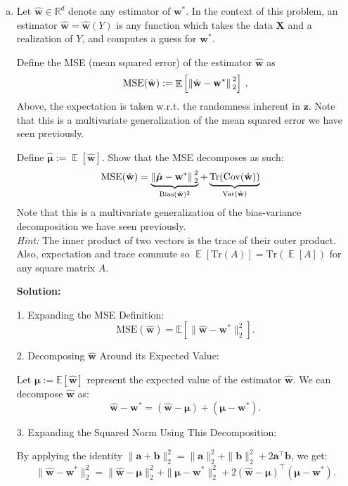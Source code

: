 \documentclass{article}
\newcommand{\mat}[1]{\mathbf{#1}}
\renewcommand{\vec}[1]{\boldsymbol{\mathbf{#1}}}
\DeclareMathOperator*{\E}{\mathbb{E}}
\newenvironment{solution}{\color{blue} \smallskip \textbf{Solution:}}{}
\begin{document}
\begin{enumerate}[(a)]
    \item 
    Let $\hat{\vec{w}} \in \mathbb{R}^{d}$ denote any estimator of $\vec{w}^*$.  In the context of this problem, an estimator $\hat{\vec{w}} = \hat{\vec{w}}(Y)$ is any function which takes the data $\mat{X}$ and a realization of $Y$, and computes a guess for $\vec{w}^*$.
    
    Define the MSE (mean squared error) of the estimator $\hat{\vec{w}}$ as
    \begin{align*}
        \mathrm{MSE}(\hat{\vec{w}}) := \E\left[\norm*{ \hat{\vec{w}} - \vec{w}^* }^2_2\right] \:.
    \end{align*}
    Above, the expectation is taken w.r.t. the randomness inherent in $\vec{z}$. Note that this is a multivariate generalization of the mean squared error we have seen previously.
    
    Define $\hat{\vec{\mu}} := \E[\hat{\vec{w}}]$. Show that the MSE decomposes as such:
    \begin{align*}
        \mathrm{MSE}(\hat{\vec{w}}) &= \underbrace{\norm*{\hat{\vec{\mu}} - \vec{w}^*}^2_2}_{\text{Bias}(\hat{\vec{w}})^2} +  \underbrace{\text{Tr}(\mathrm{Cov}(\hat{\vec{w}}))}_{\text{Var}(\hat{\vec{w}})}
    \end{align*}
    Note that this is a multivariate generalization of the bias-variance decomposition we have seen previously. \\
    \textit{Hint:} The inner product of two vectors is the trace of their outer product. Also, expectation and trace commute so $\E[\text{Tr}(A)] = \text{Tr}( \E[A] )$ for any square matrix $A$.
    
    \begin{solution}

1. Expanding the MSE Definition:
   \[
   \text{MSE}(\hat{\mathbf{w}}) = \mathbb{E} \left[ \| \hat{\mathbf{w}} - \mathbf{w}^* \|_2^2 \right].
   \]

2. Decomposing \(\hat{\mathbf{w}}\) Around its Expected Value:

   Let \(\boldsymbol{\mu} := \mathbb{E}[\hat{\mathbf{w}}]\) represent the expected value of the estimator \(\hat{\mathbf{w}}\). We can decompose \(\hat{\mathbf{w}}\) as:
   \[
   \hat{\mathbf{w}} - \mathbf{w}^* = (\hat{\mathbf{w}} - \boldsymbol{\mu}) + (\boldsymbol{\mu} - \mathbf{w}^*).
   \]

3. Expanding the Squared Norm Using This Decomposition:

   By applying the identity \(\| \mathbf{a} + \mathbf{b} \|_2^2 = \| \mathbf{a} \|_2^2 + \| \mathbf{b} \|_2^2 + 2 \mathbf{a}^\top \mathbf{b}\), we get:
   \[
   \| \hat{\mathbf{w}} - \mathbf{w}^* \|_2^2 = \| \hat{\mathbf{w}} - \boldsymbol{\mu} \|_2^2 + \| \boldsymbol{\mu} - \mathbf{w}^* \|_2^2 + 2 (\hat{\mathbf{w}} - \boldsymbol{\mu})^\top (\boldsymbol{\mu} - \mathbf{w}^*).
   \]


\end{solution}
\end{enumerate}
\end{document}
